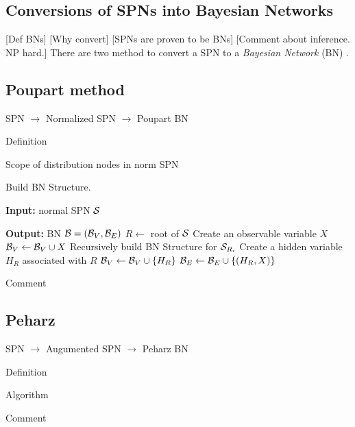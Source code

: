 \subsection{Conversions of SPNs into Bayesian Networks}

[Def BNs]
[Why convert]
[SPNs are proven to be BNs]
[Comment about inference. NP hard.]
There are two method to convert a SPN to a \emph{Bayesian Network} (BN) \cite{pear88}.

\subsection{Poupart method}

SPN $\rightarrow$ Normalized SPN $\rightarrow$ Poupart BN

Definition

Scope of distribution nodes in norm SPN

\begin{algorithm}[!ht]
    \caption{\cite{zhao2015relationship} Build BN Structure.}
    \label{alg:poupart}
    \begin{algorithmic}[1]
        \item[\textbf{Input:} normal SPN $\cal S$]
        \item[\textbf{Output:} BN ${\cal B} = ({\cal B}_V, {\cal B}_E)$]
		\State $R \leftarrow$ root of ${\cal S}$
			\State Create an observable variable $X$
			\State ${\cal B}_V \leftarrow {\cal B}_V \cup X$
		\Else
					\State Recursively build BN Structure for ${\cal S}_{R_i}$
				\EndIf
			\EndFor
				\State Create a hidden variable $H_R$ associated with $R$
				\State ${\cal B}_V \leftarrow {\cal B}_V \cup \{H_R\}$
					\State ${\cal B}_E \leftarrow {\cal B}_E \cup \{(H_R,X)\}$
				\EndFor
			\EndIf
		\EndIf		
    \end{algorithmic}
\end{algorithm}

Comment

\subsection{Peharz}

SPN $\rightarrow$ Augumented SPN $\rightarrow$ Peharz BN

Definition

Algorithm

Comment